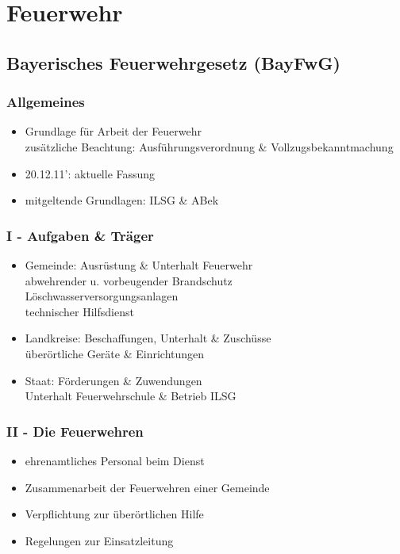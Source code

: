 \section{Feuerwehr}
\subsection{Bayerisches Feuerwehrgesetz (BayFwG)}
\begin{normbox}{\subsubsection{Allgemeines}}
    \begin{itemize}
        \item Grundlage für Arbeit der Feuerwehr\\
        \ra zusätzliche Beachtung: Ausführungsverordnung \& Vollzugsbekanntmachung
        \item 20.12.11': aktuelle Fassung
        \item mitgeltende Grundlagen: ILSG \& ABek
    \end{itemize}
\end{normbox}
\begin{normbox}{\subsubsection{I - Aufgaben \& Träger}}
    \begin{itemize}
        \item Gemeinde: Ausrüstung \& Unterhalt Feuerwehr\\
        \ra abwehrender u. vorbeugender Brandschutz\\
        \ra Löschwasserversorgungsanlagen\\
        \ra technischer Hilfsdienst
        \item Landkreise: Beschaffungen, Unterhalt \& Zuschüsse\\
        \ra überörtliche Geräte \& Einrichtungen
        \item Staat: Förderungen \& Zuwendungen\\
        \ra Unterhalt Feuerwehrschule \& Betrieb ILSG 
    \end{itemize}
\end{normbox}
\begin{normbox}{\subsubsection{II - Die Feuerwehren}}
    \begin{itemize}
        \item ehrenamtliches Personal beim Dienst 
        \item Zusammenarbeit der Feuerwehren einer Gemeinde
        \item Verpflichtung zur überörtlichen Hilfe
        \item Regelungen zur Einsatzleitung
    \end{itemize}
\end{normbox}
